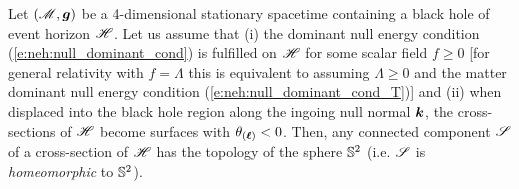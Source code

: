 \begin{prop}
\label{p:sta:topology1}
Let $(\mathscr{M}, \bm{g})$ be a 4-dimensional stationary spacetime
containing a black hole of event horizon $\mathscr{H}$.
Let us assume that
(i) the dominant null energy condition (\ref{e:neh:null_dominant_cond})
is fulfilled on $\mathscr{H}$ for some scalar field $f \geq 0$
[for general relativity with $f=\Lambda$
this is equivalent to assuming $\Lambda \geq 0$ and
the matter dominant null energy condition (\ref{e:neh:null_dominant_cond_T})]
and (ii) when
displaced into the black hole region along the ingoing null normal $\bm{k}$, the
cross-sections of $\mathscr{H}$ become surfaces with $\theta_{(\bm{\ell})} < 0$.
Then, any connected component $\mathscr{S}$ of a cross-section of $\mathscr{H}$
has the topology of the sphere $\mathbb{S}^2$ (i.e. $\mathscr{S}$ is
\emph{homeomorphic} to $\mathbb{S}^2$).
\end{prop}
